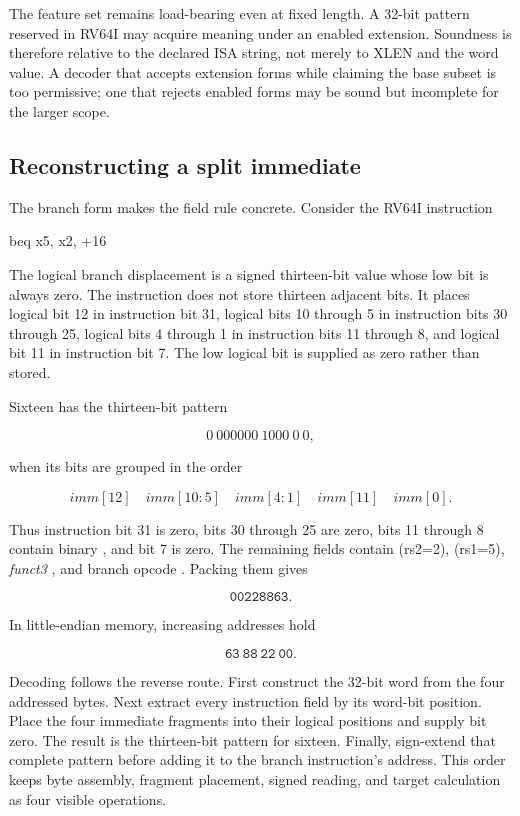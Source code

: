 The feature set remains load-bearing even at fixed length. A 32-bit pattern
reserved in RV64I may acquire meaning under an enabled extension. Soundness is
therefore relative to the declared ISA string, not merely to XLEN and the word
value. A decoder that accepts extension forms while claiming the base subset is
too permissive; one that rejects enabled forms may be sound but incomplete for
the larger scope.

\subsection{Reconstructing a split immediate}

The branch form makes the field rule concrete. Consider the RV64I instruction

\begin{codelisting}[language={},caption={A branch sixteen bytes forward}]
beq x5, x2, +16
\end{codelisting}

The logical branch displacement is a signed thirteen-bit value whose low bit
is always zero. The instruction does not store thirteen adjacent bits. It
places logical bit 12 in instruction bit 31, logical bits 10 through 5 in
instruction bits 30 through 25, logical bits 4 through 1 in instruction bits
11 through 8, and logical bit 11 in instruction bit 7. The low logical bit is
supplied as zero rather than stored.

Sixteen has the thirteen-bit pattern

\[
  0\ 000000\ 1000\ 0\ 0,
\]

when its bits are grouped in the order

\[
  \mathit{imm}[12]\quad
  \mathit{imm}[10{:}5]\quad
  \mathit{imm}[4{:}1]\quad
  \mathit{imm}[11]\quad
  \mathit{imm}[0].
\]

Thus instruction bit 31 is zero, bits 30 through 25 are zero, bits 11 through
8 contain binary , and bit 7 is zero. The remaining fields contain
(rs2=2), (rs1=5), \textit{funct3} , and branch opcode
. Packing them gives

\[
  \mathtt{00228863}.
\]

In little-endian memory, increasing addresses hold

\[
  \mathtt{63\ 88\ 22\ 00}.
\]

Decoding follows the reverse route. First construct the 32-bit word from the
four addressed bytes. Next extract every instruction field by its word-bit
position. Place the four immediate fragments into their logical positions and
supply bit zero. The result is the thirteen-bit pattern for sixteen. Finally,
sign-extend that complete pattern before adding it to the branch instruction's
address. This order keeps byte assembly, fragment placement, signed reading,
and target calculation as four visible operations.


